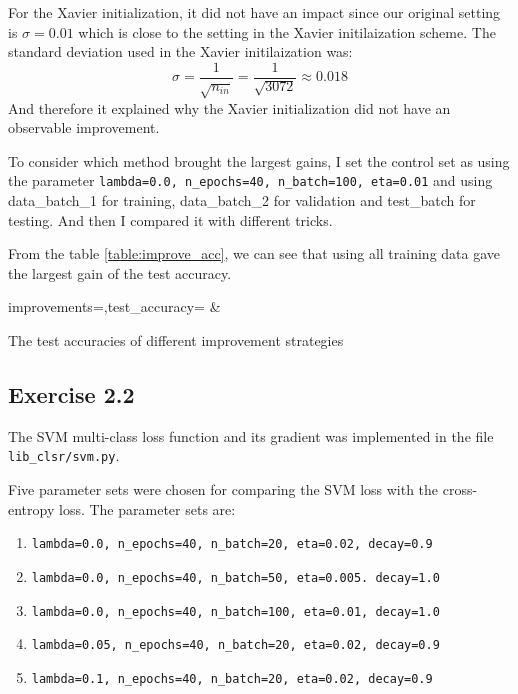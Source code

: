 \documentclass[12pt]{article}
\begin{document}
For the Xavier initialization, it did not have an impact since our original
setting is $\sigma = 0.01$ which is close to the setting in the Xavier initilaization
scheme. The standard deviation used in the Xavier initilaization was:
\begin{equation*}
    \sigma = \frac{1}{\sqrt{n_{in}}} = \frac{1}{\sqrt{3072}} \approx 0.018
\end{equation*}
And therefore it explained why the Xavier initialization did not have an observable
improvement.

To consider which method brought the largest gains, I set the control set as using
the parameter
\texttt{lambda=0.0, n\_epochs=40, n\_batch=100, eta=0.01} and using data\_batch\_1
for training, data\_batch\_2 for validation and test\_batch for testing.
And then I compared it with different tricks.

From the table \ref{table:improve_acc}, we can see that using all training data gave
the largest gain of the test accuracy.
\begin{table}
    \centering
    {improvements=\improve,test_accuracy=\testAcc}
    {\improve & \testAcc}
    \caption{The test accuracies of different improvement strategies}
    \label{table:improve_acc}
\end{table}

\subsection{Exercise 2.2}

The SVM multi-class loss function and its gradient was implemented in the file
\texttt{lib\_clsr/svm.py}.

Five parameter sets were chosen for comparing the SVM loss with the cross-entropy loss.
The parameter sets are:
\begin{enumerate}
    \item  \texttt{lambda=0.0, n\_epochs=40, n\_batch=20, eta=0.02, decay=0.9}
    \item  \texttt{lambda=0.0, n\_epochs=40, n\_batch=50, eta=0.005. decay=1.0}
    \item  \texttt{lambda=0.0, n\_epochs=40, n\_batch=100, eta=0.01, decay=1.0}
    \item  \texttt{lambda=0.05, n\_epochs=40, n\_batch=20, eta=0.02, decay=0.9}
    \item  \texttt{lambda=0.1, n\_epochs=40, n\_batch=20, eta=0.02, decay=0.9}
\end{enumerate}
\end{document}
